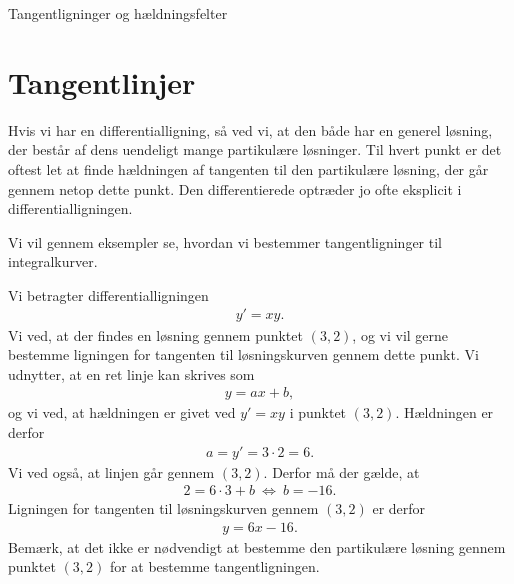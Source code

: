 \begin{center}
\Huge
Tangentligninger og hældningsfelter
\end{center}


\section*{Tangentlinjer}

Hvis vi har en differentialligning, så ved vi, at den både har en generel løsning, der består af dens uendeligt mange partikulære løsninger. Til hvert punkt er det oftest let at finde hældningen af tangenten til den partikulære løsning, der går gennem netop dette punkt. Den differentierede optræder jo ofte eksplicit i differentialligningen. 

Vi vil gennem eksempler se, hvordan vi bestemmer tangentligninger til integralkurver. 

\begin{exa}
	Vi betragter differentialligningen 
	\begin{align*}
		y' = xy. 
	\end{align*}
	Vi ved, at der findes en løsning gennem punktet $(3,2)$, og vi vil gerne bestemme ligningen for tangenten til løsningskurven gennem dette punkt. Vi udnytter, at
	en ret linje kan skrives som 
	\begin{align*}
		y = ax+b,
	\end{align*}
	og vi ved, at hældningen er givet ved $y' = xy$ i punktet $(3,2)$. Hældningen er derfor
	\begin{align*}
		a = y' = 3\cdot 2 = 6.
	\end{align*}
	Vi ved også, at linjen går gennem $(3,2)$. Derfor må der gælde, at 
	\begin{align*}
		2 = 6\cdot 3 + b \ \Leftrightarrow \  b =-16. 
	\end{align*}
	Ligningen for tangenten til løsningskurven gennem $(3,2)$ er derfor
	\begin{align*}
		y = 6x-16.
	\end{align*}
	Bemærk, at det ikke er nødvendigt at bestemme den partikulære løsning gennem punktet $(3,2)$ for at bestemme tangentligningen.
\end{exa}


